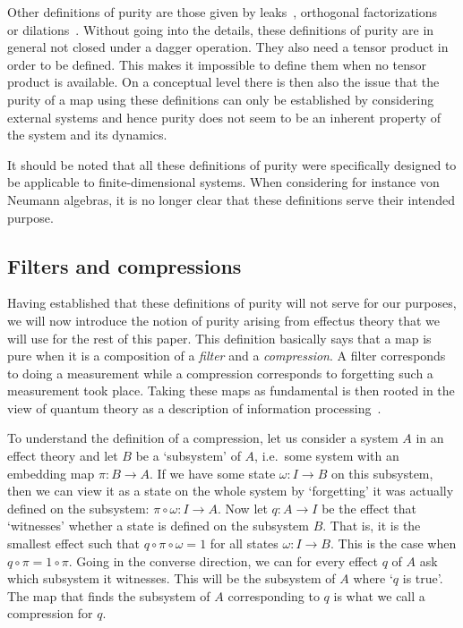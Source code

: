 \documentclass[a4paper,onecolumn,10pt,accepted=2019-05-03, issue=1, volume=1, shorttitle=papers/compositionality-1-1]{compositionalityarticle}
\numberwithin{counter}{section}
\begin{document}
Other definitions of purity are those given by leaks~\cite{selby2018reconstructing}, orthogonal factorizations~\cite{cunningham2017purity} or dilations~\cite{tull2019phdthesis}. Without going into the details, these definitions of purity are in general not closed under a dagger operation. They also need a tensor product in order to be defined. This makes it impossible to define them when no tensor product is available. On a conceptual level there is then also the issue that the purity of a map using these definitions can only be established by considering external systems and hence purity does not seem to be an inherent property of the system and its dynamics.

It should be noted that all these definitions of purity were specifically designed to be applicable to finite-dimensional systems. When considering for instance von Neumann algebras, it is no longer clear that these definitions serve their intended purpose.

\subsection{Filters and compressions}\label{sec:filterscompressions}
Having established that these definitions of purity will not serve for our purposes, we will now introduce the notion of purity arising from effectus theory that we will use for the rest of this paper. This definition basically says that a map is pure when it is a composition of a \emph{filter} and a \emph{compression}. A filter corresponds to doing a measurement while a compression corresponds to forgetting such a measurement took place. Taking these maps as fundamental is then rooted in the view of quantum theory as a description of information processing~\cite{fuchs2002quantum}.

To understand the definition of a compression, let us consider a system $A$ in an effect theory and let $B$ be a `subsystem' of $A$, i.e.\ some system with an embedding map $\pi: B\rightarrow A$. 
If we have some state $\omega:I\rightarrow B$ on this subsystem, then we can view it as a state on the whole system by `forgetting' it was actually defined on the subsystem: $\pi\circ \omega: I\rightarrow A$. Now let $q:A\rightarrow I$ be the effect that `witnesses' whether a state is defined on the subsystem $B$. That is, it is the smallest effect such that $q\circ \pi\circ\omega = 1$ for all states $\omega:I\rightarrow B$. This is the case when $q\circ \pi = 1\circ \pi$. Going in the converse direction, we can for every effect $q$ of $A$ ask which subsystem it witnesses. This will be the subsystem of $A$ where `$q$ is true'. The map that finds the subsystem of $A$ corresponding to $q$ is what we call a compression for $q$.
\end{document}
